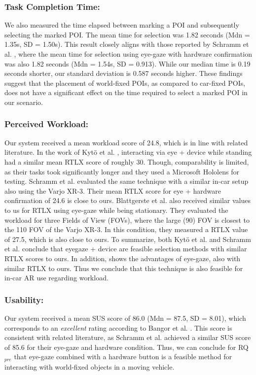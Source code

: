 \subsubsection*{\textbf{Task Completion Time:}} We also measured the time elapsed between marking a POI and subsequently selecting the marked POI. The mean time for selection was 1.82 seconds (Mdn = 1.35s, SD = 1.50s). This result closely aligns with those reported by Schramm et al. \cite{Schramm2023Assessing}, where the mean time for selection using eye-gaze with hardware confirmation was also 1.82 seconds (Mdn = 1.54s, SD = 0.913). While our median time is 0.19 seconds shorter, our standard deviation is 0.587 seconds higher. These findings suggest that the placement of world-fixed POIs, as compared to car-fixed POIs, does not have a significant effect on the time required to select a marked POI in our scenario.

\subsubsection*{\textbf{Perceived Workload}:} Our system received a mean workload score of 24.8, which is in line with related literature. In the work of Kyt{\"o} et al. \cite{kyto2018pinpointing}, interacting via eye + device while standing had a similar mean RTLX score of roughly 30. Though, comparability is limited, as their tasks took significantly longer and they used a Microsoft Hololens for testing. Schramm et al. \cite{Schramm2023Assessing} evaluated the same technique with a similar in-car setup also using the Varjo XR-3. Their mean RTLX score for eye + hardware confirmation of 24.6 is close to ours. Blattgerste et al. \cite{blattgerste2018advantages} also received similar values to us for RTLX using eye-gaze while being stationary. They evaluated the workload for three Fields of View (FOVs), where the large (90\textdegree{}) FOV is closest to the 110\textdegree{} FOV of the Varjo XR-3. In this condition, they measured a RTLX value of 27.5, which is also close to ours. To summarize, both Kyt{\"o} et al. \cite{kyto2018pinpointing} and Schramm et al. \cite{Schramm2023Assessing} conclude that eyegaze + device are feasible selection methods  with similar RTLX scores to ours. In addition, \cite{blattgerste2018advantages} shows the advantages of eye-gaze, also with similar RTLX to ours. Thus we conclude that this technique is also feasible for in-car AR use regarding workload. 

\subsubsection*{\textbf{Usability:}} Our system received a mean SUS score of 86.0 (Mdn = 87.5, SD = 8.01), which corresponds to an \textit{excellent} rating according to Bangor et al. \cite{bangor2009sus}. This score is consistent with related literature, as Schramm et al. \cite{Schramm2023Assessing} achieved a similar SUS score of 85.6 for their eye-gaze and hardware condition. Thus, we can conclude for RQ$_{pre}$ that eye-gaze combined with a hardware button is a feasible method for interacting with world-fixed objects in a moving vehicle.



